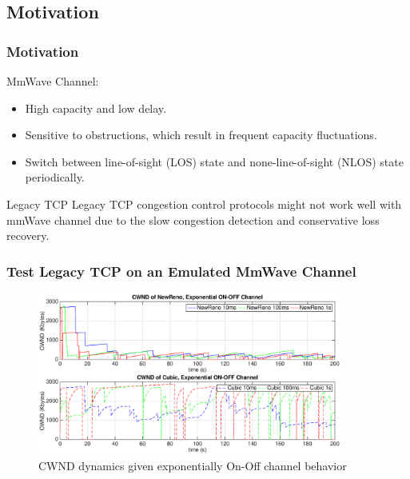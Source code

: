 \documentclass{beamer}
\begin{document}
\subsection{Motivation}
\begin{frame}
\frametitle{Motivation}
MmWave Channel:
\begin{itemize} 
\item High capacity and low delay.
\item Sensitive to obstructions, which result in frequent capacity fluctuations.
\item Switch between line-of-sight (LOS) state and none-line-of-sight (NLOS) state periodically.
\end{itemize}
\begin{block}{Legacy TCP}
Legacy TCP congestion control protocols might not work well with mmWave channel due to the slow congestion detection and conservative loss recovery.
\end{block}
\end{frame}
\begin{frame}
\frametitle{Test Legacy TCP on an Emulated MmWave Channel}
\begin{figure}
\centering
\includegraphics[width=10cm]{1.eps}
\caption{CWND dynamics given exponentially On-Off channel behavior}
\label{1st}
\end{figure}
\end{frame}
\end{document}
